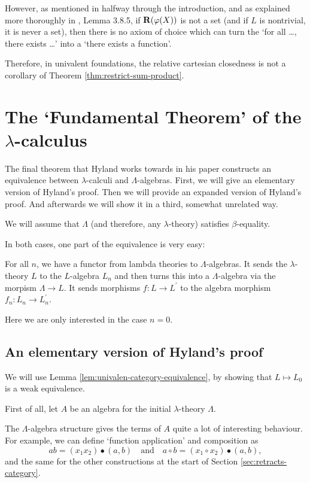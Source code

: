 \begin{remark}
  However, as mentioned in \cite{univalent-categories} halfway through the introduction, and as explained more thoroughly in \cite{hottbook}, Lemma 3.8.5, if $ \mathbf{R}(\varphi(X)) $ is not a set (and if $ L $ is nontrivial, it is never a set), then there is no axiom of choice which can turn the `for all \dots, there exists \dots' into a `there exists a function'.

  Therefore, in univalent foundations, the relative cartesian closedness is not a corollary of Theorem \ref{thm:restrict-sum-product}.
\end{remark}

\section{The `Fundamental Theorem' of the \texorpdfstring{$ \lambda $}{lambda}-calculus}

The final theorem that Hyland works towards in his paper constructs an equivalence between $ \lambda $-calculi and $ \Lambda $-algebras. First, we will give an elementary version of Hyland's proof. Then we will provide an expanded version of Hyland's proof. And afterwards we will show it in a third, somewhat unrelated way.

We will assume that $ \Lambda $ (and therefore, any $ \lambda $-theory) satisfies $ \beta $-equality.

In both cases, one part of the equivalence is very easy:
\begin{definition}
  For all $ n $, we have a functor from lambda theories to $ \Lambda $-algebras. It sends the $ \lambda $-theory $ L $ to the $ L $-algebra $ L_n $ and then turns this into a $ \Lambda $-algebra via the morpism $ \Lambda \to L $. It sends morphisms $ f: L \to L^\prime $ to the algebra morphism $ f_n : L_n \to L^\prime_n $.
\end{definition}
Here we are only interested in the case $ n = 0 $.

\subsection{An elementary version of Hyland's proof}
We will use Lemma \ref{lem:univalen-category-equivalence}, by showing that $ L \mapsto L_0 $ is a weak equivalence.

First of all, let $ A $ be an algebra for the initial $ \lambda $-theory $ \Lambda $.

The $ \Lambda $-algebra structure gives the terms of $ A $ quite a lot of interesting behaviour. For example, we can define `function application' and composition as
\[ a b = (x_1 x_2) \bullet (a, b) \quad \text{and} \quad a \circ b = (x_1 \circ x_2) \bullet (a, b), \]
and the same for the other constructions at the start of Section \ref{sec:retracts-category}.

